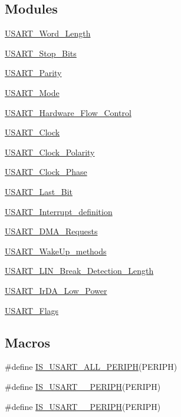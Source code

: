 \subsection*{Modules}
\begin{DoxyCompactItemize}
\item 
\hyperlink{group___u_s_a_r_t___word___length}{U\+S\+A\+R\+T\+\_\+\+Word\+\_\+\+Length}
\item 
\hyperlink{group___u_s_a_r_t___stop___bits}{U\+S\+A\+R\+T\+\_\+\+Stop\+\_\+\+Bits}
\item 
\hyperlink{group___u_s_a_r_t___parity}{U\+S\+A\+R\+T\+\_\+\+Parity}
\item 
\hyperlink{group___u_s_a_r_t___mode}{U\+S\+A\+R\+T\+\_\+\+Mode}
\item 
\hyperlink{group___u_s_a_r_t___hardware___flow___control}{U\+S\+A\+R\+T\+\_\+\+Hardware\+\_\+\+Flow\+\_\+\+Control}
\item 
\hyperlink{group___u_s_a_r_t___clock}{U\+S\+A\+R\+T\+\_\+\+Clock}
\item 
\hyperlink{group___u_s_a_r_t___clock___polarity}{U\+S\+A\+R\+T\+\_\+\+Clock\+\_\+\+Polarity}
\item 
\hyperlink{group___u_s_a_r_t___clock___phase}{U\+S\+A\+R\+T\+\_\+\+Clock\+\_\+\+Phase}
\item 
\hyperlink{group___u_s_a_r_t___last___bit}{U\+S\+A\+R\+T\+\_\+\+Last\+\_\+\+Bit}
\item 
\hyperlink{group___u_s_a_r_t___interrupt__definition}{U\+S\+A\+R\+T\+\_\+\+Interrupt\+\_\+definition}
\item 
\hyperlink{group___u_s_a_r_t___d_m_a___requests}{U\+S\+A\+R\+T\+\_\+\+D\+M\+A\+\_\+\+Requests}
\item 
\hyperlink{group___u_s_a_r_t___wake_up__methods}{U\+S\+A\+R\+T\+\_\+\+Wake\+Up\+\_\+methods}
\item 
\hyperlink{group___u_s_a_r_t___l_i_n___break___detection___length}{U\+S\+A\+R\+T\+\_\+\+L\+I\+N\+\_\+\+Break\+\_\+\+Detection\+\_\+\+Length}
\item 
\hyperlink{group___u_s_a_r_t___ir_d_a___low___power}{U\+S\+A\+R\+T\+\_\+\+Ir\+D\+A\+\_\+\+Low\+\_\+\+Power}
\item 
\hyperlink{group___u_s_a_r_t___flags}{U\+S\+A\+R\+T\+\_\+\+Flags}
\end{DoxyCompactItemize}
\subsection*{Macros}
\begin{DoxyCompactItemize}
\item 
\#define \hyperlink{group___u_s_a_r_t___exported___constants_gae890b8e77c1b84a77c485a353949f7eb}{I\+S\+\_\+\+U\+S\+A\+R\+T\+\_\+\+A\+L\+L\+\_\+\+P\+E\+R\+I\+PH}(P\+E\+R\+I\+PH)
\item 
\#define \hyperlink{group___u_s_a_r_t___exported___constants_ga30e128c5edde23e1315724c0b2000d0d}{I\+S\+\_\+\+U\+S\+A\+R\+T\+\_\+\_\+\+P\+E\+R\+I\+PH}(P\+E\+R\+I\+PH)
\item 
\#define \hyperlink{group___u_s_a_r_t___exported___constants_ga9b6af380cae2290d0653bd555deaeda1}{I\+S\+\_\+\+U\+S\+A\+R\+T\+\_\+\_\+\+P\+E\+R\+I\+PH}(P\+E\+R\+I\+PH)
\end{DoxyCompactItemize}


